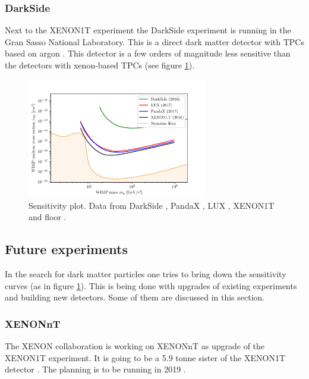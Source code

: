 \documentclass{article}
\begin{document}
\subsubsection{DarkSide}
Next to the XENON1T experiment the DarkSide experiment is running in the Gran Sasso National Laboratory. This is a direct dark matter detector with TPCs based on argon \cite{Agnes:2015ftt, Agnes:2018mon, Edkins:2017qct}. This detector is a few orders of magnitude less sensitive than the detectors with xenon-based TPCs (see figure \ref{fig:Sens}).


\begin{figure}[h]
    \centering
    \includegraphics[width=0.7\textwidth]{Sens_plot_floor.png}
    \caption{Sensitivity plot. Data from DarkSide \cite{Agnes:2015ftt}, PandaX \cite{Cui:2017nnn}, LUX \cite{Akerib:2016vxi}, XENON1T \cite{Aprile:2018dbl} and floor \cite{Liu:2017drf}.}
    \label{fig:Sens}
\end{figure}

\subsection{Future experiments}
In the search for dark matter particles one tries to bring down the sensitivity curves (as in figure \ref{fig:Sens}). This is being done with upgrades of existing experiments and building new detectors. Some of them are discussed in this section.

\subsubsection{XENONnT}
The XENON collaboration is working on XENONnT as upgrade of the XENON1T experiment. It is going to be a 5.9 tonne sister of the XENON1T detector \cite{Aprile:2018dbl}. The planning is to be running in 2019 \cite{APPEC}.
\end{document}
